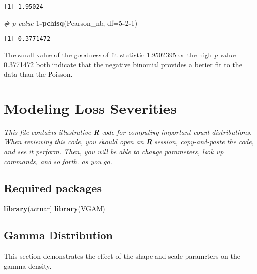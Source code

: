 \documentclass[]{book}
\newenvironment{Shaded}{\begin{snugshade}}{\end{snugshade}}
\newcommand{\KeywordTok}[1]{\textcolor[rgb]{0.13,0.29,0.53}{\textbf{#1}}}
\newcommand{\DataTypeTok}[1]{\textcolor[rgb]{0.13,0.29,0.53}{#1}}
\newcommand{\DecValTok}[1]{\textcolor[rgb]{0.00,0.00,0.81}{#1}}
\newcommand{\CommentTok}[1]{\textcolor[rgb]{0.56,0.35,0.01}{\textit{#1}}}
\newcommand{\OperatorTok}[1]{\textcolor[rgb]{0.81,0.36,0.00}{\textbf{#1}}}
\newcommand{\NormalTok}[1]{#1}
\theoremstyle{definition}
\theoremstyle{definition}
\theoremstyle{definition}
\theoremstyle{remark}
\begin{document}
\begin{verbatim}
[1] 1.95024
\end{verbatim}

\begin{Shaded}
\begin{Highlighting}[]
\CommentTok{#  p-value}
\DecValTok{1}\OperatorTok{-}\KeywordTok{pchisq}\NormalTok{(Pearson_nb, }\DataTypeTok{df=}\DecValTok{5}\OperatorTok{-}\DecValTok{2}\OperatorTok{-}\DecValTok{1}\NormalTok{)}
\end{Highlighting}
\end{Shaded}

\begin{verbatim}
[1] 0.3771472
\end{verbatim}

The small value of the goodness of fit statistic 1.9502395 or the high
\emph{p} value 0.3771472 both indicate that the negative binomial
provides a better fit to the data than the Poisson.

\chapter{Modeling Loss Severities}\label{modeling-loss-severities}

\emph{This file contains illustrative \textbf{R} code for computing
important count distributions. When reviewing this code, you should open
an \textbf{R} session, copy-and-paste the code, and see it perform.
Then, you will be able to change parameters, look up commands, and so
forth, as you go. }

\section{Required packages}\label{required-packages}

\begin{Shaded}
\begin{Highlighting}[]
\KeywordTok{library}\NormalTok{(actuar)}
\KeywordTok{library}\NormalTok{(VGAM)}
\end{Highlighting}
\end{Shaded}

\section{Gamma Distribution}\label{gamma-distribution}

This section demonstrates the effect of the shape and scale parameters
on the gamma density.
\end{document}
